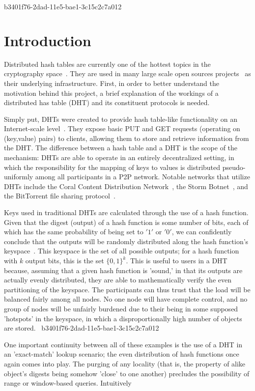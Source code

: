 \documentclass[12pt]{article}
\begin{document}
b3401f76-2dad-11e5-bae1-3c15c2c7a012\section{Introduction}
\par Distributed hash tables are currently one of the hottest topics in the cryptography space~\cite{Stoica:2001dj,Rowstron:2001ea,Ratnasamy:2001wn}. They are used in many large scale open sources projects~\cite{Freitas:2013tb,Xu:2010vs,Perfitt:2010fh} as their underlying infrastructure. First, in order to better understand the motivation behind this project, a brief explanation of the workings of a distributed has table (DHT) and its constituent protocols is needed.

\par Simply put, DHTs were created to provide hash table-like functionality on an Internet-scale level~\cite{Ratnasamy:2001wn}. They expose basic PUT and GET requests (operating on (key,value) pairs) to clients, allowing them to store and retrieve information from the DHT. The difference between a hash table and a DHT is the scope of the mechanism: DHTs are able to operate in an entirely decentralized setting, in which the responsibility for the mapping of keys to values is distributed pseudo-uniformly among all participants in a P2P network. Notable networks that utilize DHTs include the Coral Content Distribution Network~\cite{Freedman:2004vb}, the Storm Botnet~\cite{Holz:2008uk}, and the BitTorrent file sharing protocol~\cite{Cohen:y1_8mBnw}.

\par Keys used in traditional DHTs are calculated through the use of a hash function. Given that the digest (output) of a hash function is some number of bits, each of which has the same probability of being set to $'1'$ or $'0'$, we can confidently conclude that the outputs will be randomly distributed along the hash function's keyspace~. This keyspace is the set of all possible outputs; for a hash function with $k$ output bits, this is the set $\{0,1\}^k$. This is useful to users in a DHT because, assuming that a given hash function is 'sound,' in that its outputs are actually evenly distributed, they are able to mathematically verify the even partitioning of the keyspace. The participants can thus trust that the load will be balanced fairly among all nodes. No one node will have complete control, and no group of nodes will be unfairly burdened due to their being in some supposed 'hotspots' in the keyspace, in which a disproportionally high number of objects are stored.~
b3401f76-2dad-11e5-bae1-3c15c2c7a012
\par One important continuity between all of these examples is the use of a DHT in an 'exact-match' lookup scenario; the even distribution of hash functions once again comes into play. The purging of any locality (that is, the property of alike object's digests being somehow 'close' to one another) precludes the possibility of range or window-based queries. Intuitively
\end{document}
